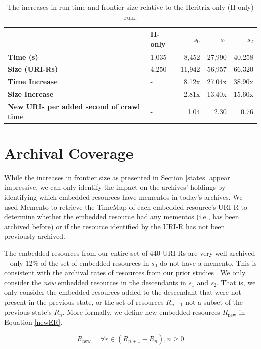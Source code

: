 \documentclass{sig-alternate}
\begin{document}
\begin{table}
\centering
\begin{tabular}{p{2.5cm} | p{0.75cm} | r | r | r}
 & \textbf{H-only} & \textbf{$s_0$} & \textbf{$s_1$} & \textbf{$s_2$}\\
\hline
\hline
\textbf{Time (s)} & 1,035 & 8,452 & 27,990 & 40,258\\
\hline
\textbf{Size (URI-Rs)} & 4,250 & 11,942 & 56,957 & 66,320\\
\hline
\hline
\textbf{Time Increase} & - & 8.12x & 27.04x & 38.90x\\
\hline
\textbf{Size Increase} & - & 2.81x & 13.40x & 15.60x\\
\hline
\textbf{New URIs per added second of crawl time} & - & 1.04 & 2.30 & 0.76\\
\hline
\end{tabular}
  \caption{The increases in run time and frontier size relative to the Heritrix-only (H-only) run.}
  \label{relatives}
\end{table}






\section{Archival Coverage}


While the increases in frontier size as presented in Section \ref{states} appear impressive, we can only identify the impact on the archives' holdings by identifying which embedded resources have mementos in today's archives. We used Memento to retrieve the TimeMap of each embedded resource's URI-R to determine whether the embedded resource had any mementos (i.e., has been archived before) or if the resource identified by the URI-R has not been previously archived.


The embedded resources from our entire set of 440 URI-Rs are very well archived -- only 12\% of the set of embedded resources in $s_0$ do not have a memento. This is consistent with the archival rates of resources from our prior studies \cite{hmotwia, ijdl}. 
We only consider the \emph{new} embedded resources in the descendants in $s_1$ and $s_2$. That is, we only consider the embedded resources added to the descendant that were not present in the previous state, or the set of resources $R_{n+1}$ not a subset of the previous state's $R_n$. More formally, we define new embedded resources $R_{\text{new}}$ in Equation \ref{newER}.

\begin{equation}
 R_{\text{new}} = \forall r \in (R_{n+1} - R_n), n \geq 0
\label{newER}
\end{equation}
\end{document}
